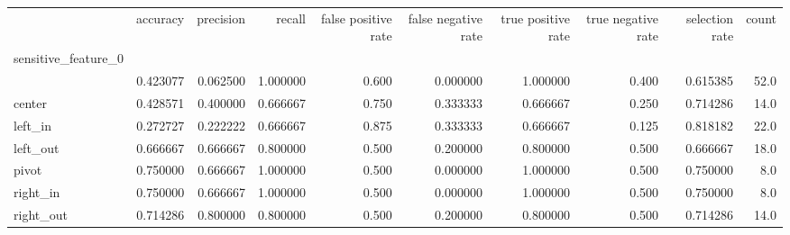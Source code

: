 \begin{tabular}{lrrrrrrrrr}
\toprule
{} &  accuracy &  precision &    recall &  false positive rate &  false negative rate &  true positive rate &  true negative rate &  selection rate &  count \\
sensitive\_feature\_0 &           &            &           &                      &                      &                     &                     &                 &        \\
\midrule
                    &  0.423077 &   0.062500 &  1.000000 &                0.600 &             0.000000 &            1.000000 &               0.400 &        0.615385 &   52.0 \\
center              &  0.428571 &   0.400000 &  0.666667 &                0.750 &             0.333333 &            0.666667 &               0.250 &        0.714286 &   14.0 \\
left\_in             &  0.272727 &   0.222222 &  0.666667 &                0.875 &             0.333333 &            0.666667 &               0.125 &        0.818182 &   22.0 \\
left\_out            &  0.666667 &   0.666667 &  0.800000 &                0.500 &             0.200000 &            0.800000 &               0.500 &        0.666667 &   18.0 \\
pivot               &  0.750000 &   0.666667 &  1.000000 &                0.500 &             0.000000 &            1.000000 &               0.500 &        0.750000 &    8.0 \\
right\_in            &  0.750000 &   0.666667 &  1.000000 &                0.500 &             0.000000 &            1.000000 &               0.500 &        0.750000 &    8.0 \\
right\_out           &  0.714286 &   0.800000 &  0.800000 &                0.500 &             0.200000 &            0.800000 &               0.500 &        0.714286 &   14.0 \\
\bottomrule
\end{tabular}
